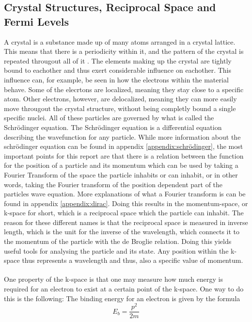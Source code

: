     \subsection{Crystal Structures, Reciprocal Space and Fermi Levels}
    A crystal is a substance made up of many atoms arranged in a crystal lattice. 
    This means that there is a periodicity within it, and the pattern of the crystal is repeated througout all of it \cite{kittel_solid_state}.  
    The elements making up the crystal are tightly bound to eachother and thus exert considerable influence on eachother. This influence can, 
    for example, be seen in how the electrons within the material behave. Some of the elecrtons are localized, meaning they stay close to a specific 
    atom. Other electrons, however, are delocalized, meaning they can more easily move througout the crystal structure, without being completly bound 
    a single specific nuclei. \cite{khaneja2024solidstate} All of these particles are governed by what is called the Schrödinger equation. The Schrödinger equation is a differential 
    equation describing the wavefunction for any particle. While more information about the schrödinger equation can be found in appendix 
    \ref{appendix:schrödinger}, the most important points for this report are that there is a relation between the function for the position of a 
    particle and its momentum which can be used by taking a Fourier Transform of the space the particle inhabits or can inhabit, or in other words, 
    taking the Fourier transform of the position dependent part of the particles wave equation. More explanations of what a Fourier transform is can 
    be found in appendix \ref{appendix:dirac}. Doing this results in the momentum-space, or k-space for short, which is a reciprocal space which the 
    particle can inhabit. The reason for these different names is that the reciprocal space is measured in inverse length, which is the unit for the 
    inverse of the wavelength, which connects it to the momentum of the particle with the de Broglie relation. Doing this yields useful tools for 
    analysing the particle and its state. Any position within the k-space thus represents a wavelength and thus, also a specific value of momentum. \\ \\ One property 
    of the k-space is that one may measure how much energy is required for an electron to exist at a certain point of the k-space. One way to do this 
    is the following: The binding energy for an electron is given by the formula \begin{equation}\label{eq:eb-from-p}
        E_b=\frac{p^2}{2m}
    \end{equation}
